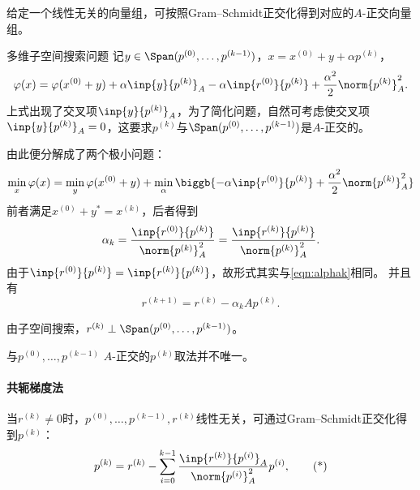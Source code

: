 \begin{corollary}
    给定一个线性无关的向量组，可按照Gram--Schmidt正交化得到对应的$A$-正交向量组。
\end{corollary}

\begin{theorem}
    {多维子空间搜索问题}{}
    记$y\in\Span(p^{(0)},\ldots,p^{(k-1)})$，$x=x^{(0)}+y+\alpha p^{(k)}$，
    \[
        \varphi(x)=\varphi(x^{(0)}+y)+\alpha\inp{y}{p^{(k)}}_A-\alpha\inp{r^{(0)}}{p^{(k)}}+\frac{\alpha^2}2\norm{p^{(k)}}^2_A.
    \]
    上式出现了交叉项$\inp{y}{p^{(k)}}_A$，为了简化问题，自然可考虑使交叉项$\inp{y}{p^{(k)}}_A=0$，这要求$p^{(k)}$与$\Span(p^{(0)},\ldots,p^{(k-1)})$是$A$-正交的。%

    由此便分解成了两个极小问题：
    \[
        \min_x\varphi(x)=\min_y\varphi(x^{(0)}+y)+\min_\alpha\biggb{-\alpha\inp{r^{(0)}}{p^{(k)}}+\frac{\alpha^2}2\norm{p^{(k)}}^2_A}
    \]
    前者满足$x^{(0)}+y^*=x^{(k)}$，后者得到
    \begin{equation}
        \alpha_k=\frac{\inp{r^{(0)}}{p^{(k)}}}{\norm{p^{(k)}}_A^2}=\frac{\inp{r^{(k)}}{p^{(k)}}}{\norm{p^{(k)}}_A^2}.
    \end{equation}
    由于$\inp{r^{(0)}}{p^{(k)}}=\inp{r^{(k)}}{p^{(k)}}$，故形式其实与\eqref{eqn:alphak}相同。
    并且有
    \begin{equation}
        \label{eqn:r^k+1=r^k-alpha_kAp^k}
        r^{(k+1)}=r^{(k)}-\alpha_kAp^{(k)}.
    \end{equation}
\end{theorem}

\begin{corollary}
    由子空间搜索，$r^{(k)}\perp\Span(p^{(0)},\ldots,p^{(k-1)})$。
\end{corollary}

\begin{remark}
    与$p^{(0)},\ldots,p^{(k-1)}$ $A$-正交的$p^{(k)}$取法并不唯一。
\end{remark}

\paragraph{共轭梯度法}

当$r^{(k)}\neq 0$时，$p^{(0)},\ldots,p^{(k-1)},r^{(k)}$线性无关，可通过Gram--Schmidt正交化得到$p^{(k)}$：
\begin{equation}
    \label{eqn:Gram-Schmidt p^k}
    p^{(k)}=r^{(k)}-\sum_{i=0}^{k-1}\frac{\inp{r^{(k)}}{p^{(i)}}_A}{\norm{p^{(i)}}_A^2}p^{(i)},
    \tag{*}
\end{equation}

